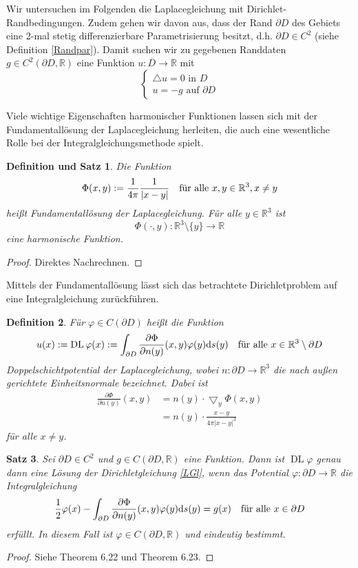 \documentclass[12pt,a4paper]{scrartcl}
\newtheorem{Satz}{Satz}[section]
\newtheorem{Def}[Satz]{Definition}
\newtheorem{DefSatz}[Satz]{Definition und Satz}
\newcommand{\dd}{\mathrm{d}}
\numberwithin{equation}{section}
\newcommand{\R}{\mathbb{R}} %
\newcommand{\laplace}{\bigtriangleup}
\newcommand{\grad}{\bigtriangledown}
\newcommand{\DL}{\operatorname{DL}}
\newcommand{\fa}{\text{\quad für alle }}
\begin{document}
Wir untersuchen im Folgenden die Laplacegleichung mit Dirichlet-Randbedingungen. Zudem gehen wir davon aus, dass der Rand $\partial D$ des Gebiets eine 2-mal stetig differenzierbare Parametrisierung  besitzt, d.h. $\partial D \in C^2$ (siehe Definition \ref{Randpar}). Damit suchen wir zu gegebenen Randdaten $g \in C^2(\partial D, \R)$ eine Funktion $u : \overline{D} \to \R$ mit
\begin{equation} \label{LGl}
 \begin{cases}
   \laplace u = 0 \text{ in } D \\
   u = -g \text{ auf } \partial D
 \end{cases}
\end{equation}  

Viele wichtige Eigenschaften harmonischer Funktionen lassen sich mit der Fundamentallösung der Laplacegleichung herleiten, die auch eine wesentliche Rolle bei der Integralgleichungsmethode spielt. 
\begin{DefSatz} \label{DFund}
  Die Funktion 
  \[
    \Phi(x,y) := \frac{1}{4 \pi} \frac{1}{|x-y|} \fa x,y \in \R^3, x\neq y
  \]
  heißt Fundamentallösung der Laplacegleichung. Für alle $y \in \R^3$ ist \[\Phi( \cdot, y) : \R^3 \setminus\{y\}  \to \R\] eine harmonische Funktion.

\end{DefSatz}   
\begin{proof}
  Direktes Nachrechnen.
\end{proof}
Mittels der Fundamentallösung lässt sich das betrachtete Dirichletproblem auf eine Integralgleichung zurückführen.
\begin{Def}
  Für $\varphi \in C(\partial D)$ heißt die Funktion
  \[    
    u(x) := \DL \varphi(x) := \int_{\partial D} \frac{\partial \Phi}{\partial n (y)}(x,y) \varphi(y) \dd s (y) \fa x \in \R^3 \setminus \partial D
  \] 
  \emph{Doppelschichtpotential der Laplacegleichung}, wobei $n: \partial D \to  \R^3$ die nach außen gerichtete Einheitsnormale bezeichnet. Dabei ist
\begin{align*}
\frac{\partial \Phi}{\partial n (y)}(x,y) &= n(y) \cdot \grad_y \Phi (x,y) \\
&=n(y) \cdot \frac{x-y}{4 \pi |x-y|^3}
\end{align*}
für alle $x \neq y$.
  
\end{Def}
\begin{Satz} \label{Intpart}
  Sei $\partial D \in C^2$ und $g \in C(\partial D, \R)$ eine Funktion. Dann ist $\DL \varphi$ genau dann eine Lösung der Dirichletgleichung \eqref{LGl}, wenn das Potential $\varphi : \partial D \to \R$ die Integralgleichung
  \begin{equation} \label{IntGl}
  \frac{1}{2}\varphi(x) - \int_{\partial D}\frac{\partial \Phi}{\partial n(y)}(x,y)\varphi(y)\dd s(y) = g(x) \fa x \in \partial D
  \end{equation}
  erfüllt. In diesem Fall ist $\varphi \in C(\partial D,\R)$ und eindeutig bestimmt.
\end{Satz} 
\begin{proof}
  Siehe \cite{kress} Theorem 6.22 und Theorem 6.23.
\end{proof}
\end{document}
